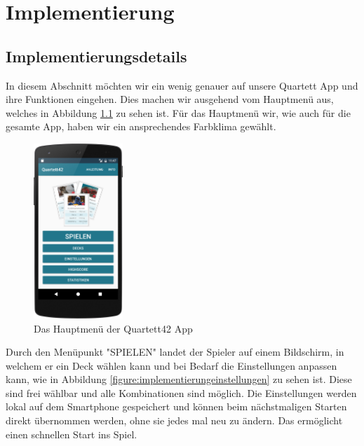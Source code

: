 \chapter{Implementierung}
\label{cha:implementierung}

\section{Implementierungsdetails}
\label{sec:implementierung:implementierungsdetails}

In diesem Abschnitt möchten wir ein wenig genauer auf unsere Quartett App und ihre Funktionen eingehen. Dies machen wir ausgehend vom Hauptmenü aus, welches in Abbildung \ref{figure:implementierungmenue} zu sehen ist. Für das Hauptmenü wir, wie auch für die gesamte App, haben wir ein ansprechendes Farbklima gewählt.

\begin{figure}[htp]
	\centering
  	\includegraphics[width=0.3\textwidth]{img/screenshots/device_main_screen.png}
	\caption{Das Hauptmenü der Quartett42 App}
	\label{figure:implementierungmenue}
\end{figure}

Durch den Menüpunkt "SPIELEN" landet der Spieler auf einem Bildschirm, in welchem er ein Deck wählen kann und bei Bedarf die Einstellungen anpassen kann, wie in Abbildung \ref{figure:implementierungeinstellungen} zu sehen ist. Diese sind frei wählbar und alle Kombinationen sind möglich. Die Einstellungen werden lokal auf dem Smartphone gespeichert und können beim nächstmaligen Starten direkt übernommen werden, ohne sie jedes mal neu zu ändern. Das ermöglicht einen schnellen Start ins Spiel.

